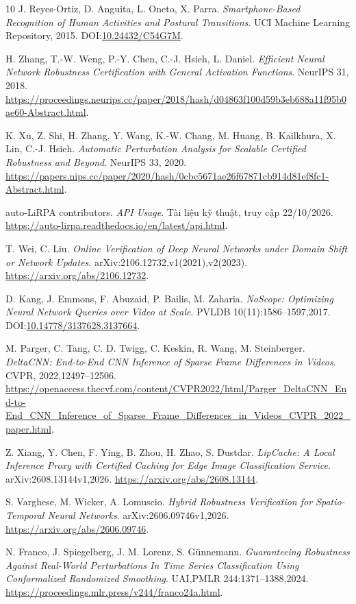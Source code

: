 \documentclass[11pt,a4paper]{article}
\begin{document}
\begin{thebibliography}{10}
J. Reyes-Ortiz, D. Anguita, L. Oneto, X. Parra.
\emph{Smartphone-Based Recognition of Human Activities and Postural Transitions}.
UCI Machine Learning Repository, 2015. DOI:\href{https://doi.org/10.24432/C54G7M}{10.24432/C54G7M}.

H. Zhang, T.-W. Weng, P.-Y. Chen, C.-J. Hsieh, L. Daniel.
\emph{Efficient Neural Network Robustness Certification with General Activation Functions}.
NeurIPS 31, 2018.
\url{https://proceedings.neurips.cc/paper/2018/hash/d04863f100d59b3eb688a11f95b0ae60-Abstract.html}.

K. Xu, Z. Shi, H. Zhang, Y. Wang, K.-W. Chang, M. Huang,
B. Kailkhura, X. Lin, C.-J. Hsieh.
\emph{Automatic Perturbation Analysis for Scalable Certified Robustness and Beyond}.
NeurIPS 33, 2020.
\url{https://papers.nips.cc/paper/2020/hash/0cbc5671ae26f67871cb914d81ef8fc1-Abstract.html}.

auto-LiRPA contributors. \emph{API Usage}.
Tài liệu kỹ thuật, truy cập 22/10/2026.
\url{https://auto-lirpa.readthedocs.io/en/latest/api.html}.

T. Wei, C. Liu.
\emph{Online Verification of Deep Neural Networks under Domain Shift or Network Updates}.
arXiv:2106.12732,v1(2021),v2(2023).
\url{https://arxiv.org/abs/2106.12732}.

D. Kang, J. Emmons, F. Abuzaid, P. Bailis, M. Zaharia.
\emph{NoScope: Optimizing Neural Network Queries over Video at Scale}.
PVLDB 10(11):1586--1597,2017.
DOI:\href{https://doi.org/10.14778/3137628.3137664}{10.14778/3137628.3137664}.

M. Parger, C. Tang, C. D. Twigg, C. Keskin, R. Wang, M. Steinberger.
\emph{DeltaCNN: End-to-End CNN Inference of Sparse Frame Differences in Videos}.
CVPR, 2022,12497--12506.
\url{https://openaccess.thecvf.com/content/CVPR2022/html/Parger_DeltaCNN_End-to-End_CNN_Inference_of_Sparse_Frame_Differences_in_Videos_CVPR_2022_paper.html}.

Z. Xiang, Y. Chen, F. Ying, B. Zhou, H. Zhao, S. Dustdar.
\emph{LipCache: A Local Inference Proxy with Certified Caching for Edge Image Classification Service}.
arXiv:2608.13144v1,2026.
\url{https://arxiv.org/abs/2608.13144}.

S. Varghese, M. Wicker, A. Lomuscio.
\emph{Hybrid Robustness Verification for Spatio-Temporal Neural Networks}.
arXiv:2606.09746v1,2026.
\url{https://arxiv.org/abs/2606.09746}.

N. Franco, J. Spiegelberg, J. M. Lorenz, S. G\"unnemann.
\emph{Guaranteeing Robustness Against Real-World Perturbations In Time Series
Classification Using Conformalized Randomized Smoothing}.
UAI,PMLR 244:1371--1388,2024.
\url{https://proceedings.mlr.press/v244/franco24a.html}.
\end{thebibliography}
\end{document}

